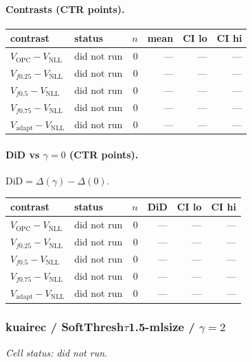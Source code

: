 \documentclass[10pt,a4paper]{article}
\begin{document}
\paragraph{Contrasts (CTR points).}
{\centering\small\begin{tabular}{llrrrr}
\toprule contrast & status & $n$ & mean & CI lo & CI hi \\
\midrule
$V_{\mathrm{OPC}}-V_{\mathrm{NLL}}$ & did not run & 0 & --- & --- & --- \\
$V_{f0.25}-V_{\mathrm{NLL}}$ & did not run & 0 & --- & --- & --- \\
$V_{f0.5}-V_{\mathrm{NLL}}$ & did not run & 0 & --- & --- & --- \\
$V_{f0.75}-V_{\mathrm{NLL}}$ & did not run & 0 & --- & --- & --- \\
$V_{\mathrm{adapt}}-V_{\mathrm{NLL}}$ & did not run & 0 & --- & --- & --- \\
\bottomrule\end{tabular}\par}
\paragraph{DiD vs $\gamma=0$ (CTR points).} $\mathrm{DiD}=\Delta(\gamma)-\Delta(0)$.
{\centering\small\begin{tabular}{llrrrr}
\toprule contrast & status & $n$ & DiD & CI lo & CI hi \\
\midrule
$V_{\mathrm{OPC}}-V_{\mathrm{NLL}}$ & did not run & 0 & --- & --- & --- \\
$V_{f0.25}-V_{\mathrm{NLL}}$ & did not run & 0 & --- & --- & --- \\
$V_{f0.5}-V_{\mathrm{NLL}}$ & did not run & 0 & --- & --- & --- \\
$V_{f0.75}-V_{\mathrm{NLL}}$ & did not run & 0 & --- & --- & --- \\
$V_{\mathrm{adapt}}-V_{\mathrm{NLL}}$ & did not run & 0 & --- & --- & --- \\
\bottomrule\end{tabular}\par}
\bigskip
\subsubsection{kuairec / SoftThresh$\tau$1.5-mlsize / $\gamma=2$}
\emph{Cell status: did not run}.
\end{document}
